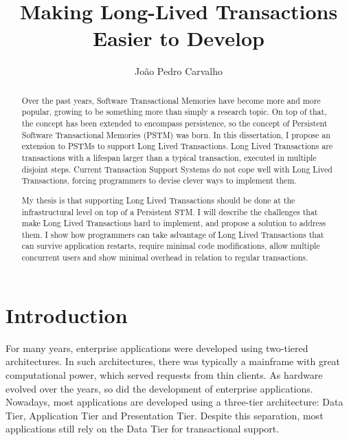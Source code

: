 \documentclass{llncs}
\begin{document}
\title{Making Long-Lived Transactions Easier to Develop}

\author{Jo\~{a}o Pedro Carvalho} 
\maketitle


\begin{abstract}
Over the past years, Software Transactional Memories have become more
and more popular, growing to be something more than simply a research
topic. On top of that, the concept has been extended to encompass
persistence, so the concept of Persistent Software Transactional
Memories (PSTM) was born. In this dissertation, I propose an extension
to PSTMs to support Long Lived Transactions. Long Lived Transactions
are transactions with a lifespan larger than a typical transaction,
executed in multiple disjoint steps. Current Transaction Support
Systems do not cope well with Long Lived Transactions, forcing
programmers to devise clever ways to implement them.

My thesis is that supporting Long Lived Transactions should be done at
the infrastructural level on top of a Persistent STM.  I will describe
the challenges that make Long Lived Transactions hard to implement,
and propose a solution to address them. I show how programmers can
take advantage of Long Lived Transactions that can survive application
restarts, require minimal code modifications, allow multiple
concurrent users and show minimal overhead in relation to regular
transactions.
\end{abstract}


\section{Introduction}

For many years, enterprise applications were developed using
two-tiered architectures. In such architectures, there was typically a
mainframe with great computational power, which served requests from
thin clients. As hardware evolved over the years, so did the
development of enterprise applications. Nowadays, most applications
are developed using a three-tier architecture: Data Tier, Application
Tier and Presentation Tier. Despite this separation, most applications
still rely on the Data Tier for transactional support.
\end{document}

